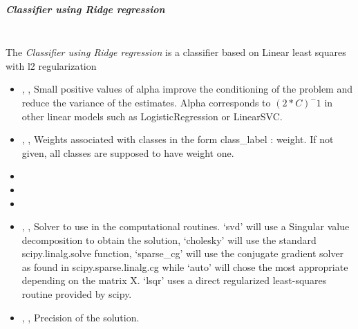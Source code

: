 \subparagraph{Classifier using Ridge regression}
\mbox{}
\\The \textit{Classifier using Ridge regression} is a classifier based on Linear
least squares with l2 regularization
\begin{itemize}
  \item {} , ,
  Small positive values of alpha improve the conditioning of the problem and
  reduce the variance of the estimates.
  Alpha corresponds to $(2*C)^-1$ in other linear models such as
  LogisticRegression or LinearSVC.
  \item {} , ,
  Weights associated with classes in the form {class\_label :
    weight}.
  If not given, all classes are supposed to have weight one.
  \item {}
  \item {}
  \item {}
  \item {} , ,
  Solver to use in the computational routines.
  ‘svd’ will use a Singular value decomposition to obtain the solution,
  ‘cholesky’ will use the standard scipy.linalg.solve function,
  ‘sparse\_cg’ will use the conjugate gradient solver as found
  in scipy.sparse.linalg.cg while ‘auto’ will chose the most appropriate
  depending on the matrix X.
  ‘lsqr’ uses a direct regularized least-squares routine provided by scipy.
  \item {} , ,
  Precision of the solution.
\end{itemize}

